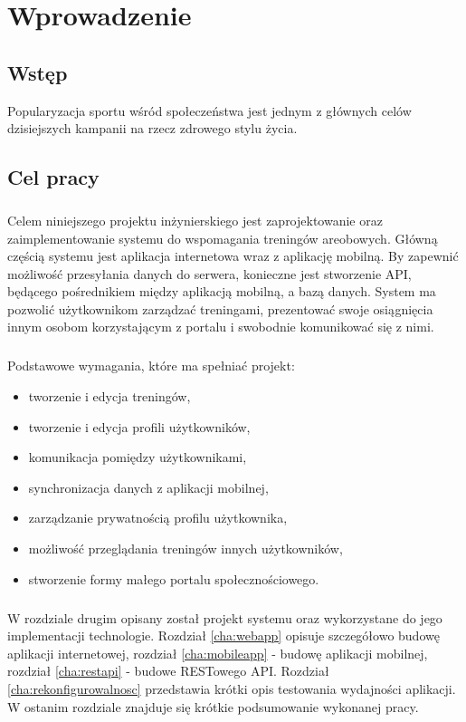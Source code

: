 \chapter{Wprowadzenie}

\section{Wstęp} %
\label{sec:wst_p}
Popularyzacja sportu wśród społeczeństwa jest jednym z głównych celów dzisiejszych kampanii na rzecz zdrowego stylu życia. 

\section{Cel pracy}
\label{sec:cel_pracy}
\paragraph{}
Celem niniejszego projektu inżynierskiego jest zaprojektowanie oraz zaimplementowanie systemu do wspomagania treningów areobowych. Główną częścią systemu jest aplikacja internetowa wraz z aplikację mobilną. By zapewnić możliwość przesyłania danych do serwera, konieczne jest stworzenie API, będącego pośrednikiem między aplikacją mobilną, a bazą danych.
System ma pozwolić użytkownikom zarządzać treningami, prezentować swoje osiągnięcia innym osobom korzystającym z portalu i swobodnie komunikować się z nimi.
\paragraph{} %
\label{par:}
Podstawowe wymagania, które ma spełniać projekt:
\begin{itemize}
	\item tworzenie i edycja treningów,
	\item tworzenie i edycja profili użytkowników,
	\item komunikacja pomiędzy użytkownikami,
	\item synchronizacja danych z aplikacji mobilnej,
	\item zarządzanie prywatnością profilu użytkownika,
	\item możliwość przeglądania treningów innych użytkowników,
	\item stworzenie formy małego portalu społecznościowego.
\end{itemize}

\paragraph{} %
W rozdziale drugim opisany został projekt systemu oraz wykorzystane do jego implementacji technologie. Rozdział \ref{cha:webapp} opisuje szczegółowo budowę aplikacji internetowej, rozdział \ref{cha:mobileapp} - budowę aplikacji mobilnej, rozdział \ref{cha:restapi} - budowe RESTowego API. Rozdział \ref{cha:rekonfigurowalnosc} przedstawia krótki opis testowania wydajności aplikacji. W ostanim rozdziale znajduje się krótkie podsumowanie wykonanej pracy.

